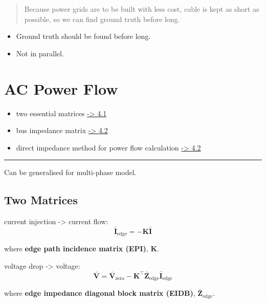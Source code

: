 \documentclass[
]{book}
\providecommand{\tightlist}{%
  \setlength{\itemsep}{0pt}\setlength{\parskip}{0pt}}
\begin{document}
\begin{quote}
Because power grids are to be built with less cost, cable is kept as short as
possible, so we can find ground truth before long.
\end{quote}

\begin{itemize}
\tightlist
\item
  Ground truth should be found before long.
\item
  Not in parallel.
\end{itemize}

\hypertarget{ac-power-flow}{%
\chapter{AC Power Flow}\label{ac-power-flow}}

\begin{itemize}
\tightlist
\item
  two essential matrices \protect\hyperlink{matrices}{-\textgreater{} 4.1}
\item
  bus impedance matrix \protect\hyperlink{BIM}{-\textgreater{} 4.2}
\item
  direct impedance method for power flow calculation \protect\hyperlink{power-flow}{-\textgreater{} 4.2}
\end{itemize}

\begin{center}\rule{0.5\linewidth}{0.5pt}\end{center}

Can be generalised for multi-phase model. \citep{hsieh2017matrix}

\hypertarget{matrices}{%
\section{Two Matrices}\label{matrices}}

current injection -\textgreater{} current flow:
\[
  \bar{\boldsymbol{I}}_{\text{edge}} =
  - \boldsymbol{K} \bar{\boldsymbol{I}}
\]

where \textbf{edge path incidence matrix (EPI)}, \(\boldsymbol{K}\).

voltage drop -\textgreater{} voltage:
\[
  \bar{\boldsymbol{V}} =
  \bar{\boldsymbol{V}}_{\text{zero}}
  - \boldsymbol{K}^{\top} \boldsymbol{\bar{Z}}_\text{edge}
  \bar{\boldsymbol{I}}_{\text{edge}} 
\]

where \textbf{edge impedance diagonal block matrix (EIDB)},
\(\boldsymbol{\bar{Z}}_\text{edge}\).
\end{document}
